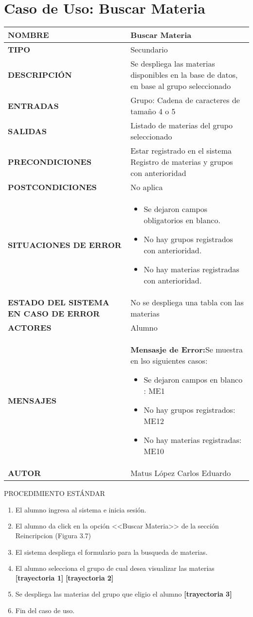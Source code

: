 \newpage
\section{Caso de Uso: Buscar Materia}
\begin{longtable}{ | p{6cm} | p{10cm} |}
\hline
\textbf{NOMBRE} & Buscar Materia\\
\hline
\textbf{TIPO} & Secundario\\
\hline
\textbf{DESCRIPCIÓN} & Se despliega las materias disponibles en la base de datos, en base al grupo seleccionado\\
\hline
\textbf{ENTRADAS} & Grupo: Cadena de caracteres de tamaño 4 o 5 \\
\hline
\textbf{SALIDAS} & Listado de materias del grupo seleccionado\\
\hline
\textbf{PRECONDICIONES} & Estar registrado en el sistema
Registro de materias y grupos con anterioridad\\
\hline
\textbf{POSTCONDICIONES} & No aplica\\
\hline
\textbf{SITUACIONES DE ERROR} & \begin{itemize}
    \item Se dejaron campos obligatorios en blanco.
    \item No hay grupos registrados con anterioridad.
    \item No hay materias registradas con anterioridad.
\end{itemize}
\\
\hline
\textbf{ESTADO DEL SISTEMA EN CASO DE ERROR} & No se despliega una tabla con las materias\\
\hline
\textbf{ACTORES} & Alumno\\
\hline
\textbf{MENSAJES} & \textbf{Mensasje de Error:}Se muestra en lso siguientes casos: \begin{itemize}
    \item Se dejaron campos en blanco : ME1
    \item No hay grupos registrados: ME12
    \item No hay materias registradas: ME10
\end{itemize} 
\\
\hline
\textbf{AUTOR} & Matus López Carlos Eduardo\\
\hline
\end{longtable}
\vspace*{1cm}
\noindent
\Large{PROCEDIMIENTO ESTÁNDAR}
\large{}
\begin{enumerate}
    \item El alumno ingresa al sistema e inicia sesión.
    \item El alumno da click en la opción <<Buscar Materia>> de la sección Reincripcion (Figura 3.7)
    \item El sistema despliega el formulario para la busqueda de materias.
    \item El alumno selecciona el grupo de cual desea visualizar las materias \textbf{[trayectoria 1]} \textbf{[trayectoria 2]}
    \item Se despliega las materias del grupo que eligio el alumno \textbf{[trayectoria 3]} 
    \item Fin del caso de uso.
\end{enumerate}
